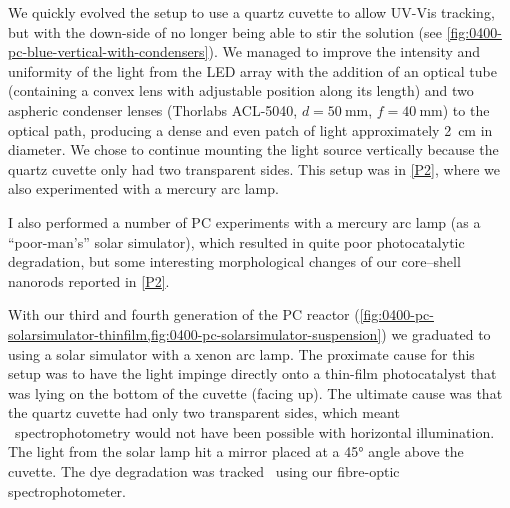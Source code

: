\documentclass[draft,webedition,openright,titles,swedish,english]{LuaUUThesis}\usepackage[]{graphicx}\usepackage[]{xcolor}
\begin{document}
We quickly evolved the setup to use a quartz cuvette to allow \insitu{} \gls{UV-Vis} tracking,
but with the down-side of no longer being able to stir the solution
(see \cref{fig:0400-pc-blue-vertical-with-condensers}).
We managed to improve the intensity and uniformity of the light from
the \gls{LED} array with the addition of an optical tube (containing a convex lens
with adjustable position along its length) and two aspheric condenser lenses
(Thorlabs ACL-5040, $d=\qty{50}{\mm}$, $f=\qty{40}{\mm}$) to the optical path,
producing a dense and even patch of light approximately \qty{2}{\cm} in diameter.
We chose to continue mounting the light source vertically because the quartz cuvette
only had two transparent sides.
This setup was in \cref{P2}, where we also experimented with a mercury arc lamp.

I also performed a number of \gls{PC} experiments with a mercury arc lamp
(as a \enquote{poor-man's} solar simulator), which resulted in quite
poor photocatalytic degradation, but some interesting morphological
changes of our core--shell nanorods reported in \cref{P2}.

With our third and fourth generation of the \gls{PC} reactor
(\cref{fig:0400-pc-solarsimulator-thinfilm,fig:0400-pc-solarsimulator-suspension})
we graduated to using a solar simulator with a xenon arc lamp.
The proximate cause for this setup was to have the light impinge directly onto a
thin-film photocatalyst that was lying on the bottom of the cuvette (facing up).
The ultimate cause was that the quartz cuvette had only two transparent sides,
which meant \insitu\ spectrophotometry would not have been possible with horizontal illumination.
The light from the solar lamp hit a mirror placed at a \ang{45} angle above the cuvette.
The dye degradation was tracked \insitu\ using our fibre-optic spectrophotometer.

%
\end{document}
